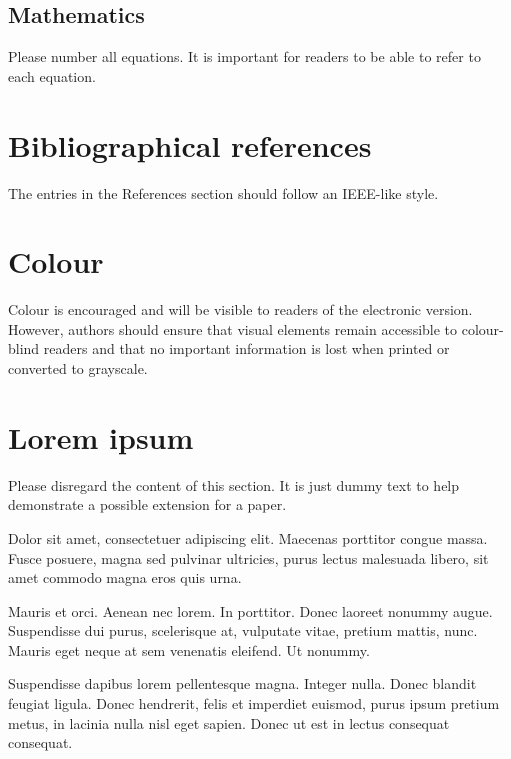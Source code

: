 \documentclass[extendedabs]{recpad2k}
\begin{document}
\subsection{Mathematics}

Please number all equations. It is important for readers to be able to refer to each equation.

\section{Bibliographical references}

The entries in the References section should follow an IEEE-like style.

\section{Colour}

Colour is encouraged and will be visible to readers of the electronic version. However, authors should ensure that visual elements remain accessible to colour-blind readers and that no important information is lost when printed or converted to grayscale.

\section{Lorem ipsum}

Please disregard the content of this section. It is just dummy text to help demonstrate a possible extension for a paper.

Dolor sit amet, consectetuer adipiscing elit. Maecenas porttitor congue massa. Fusce posuere, magna sed pulvinar ultricies, purus lectus malesuada libero, sit amet commodo magna eros quis urna.

Mauris et orci. Aenean nec lorem. In porttitor. Donec laoreet nonummy augue. Suspendisse dui purus, scelerisque at, vulputate vitae, pretium mattis, nunc. Mauris eget neque at sem venenatis eleifend. Ut nonummy.

Suspendisse dapibus lorem pellentesque magna. Integer nulla. Donec blandit feugiat ligula. Donec hendrerit, felis et imperdiet euismod, purus ipsum
pretium metus, in lacinia nulla nisl eget sapien. Donec ut est in lectus
consequat consequat.
\end{document}

